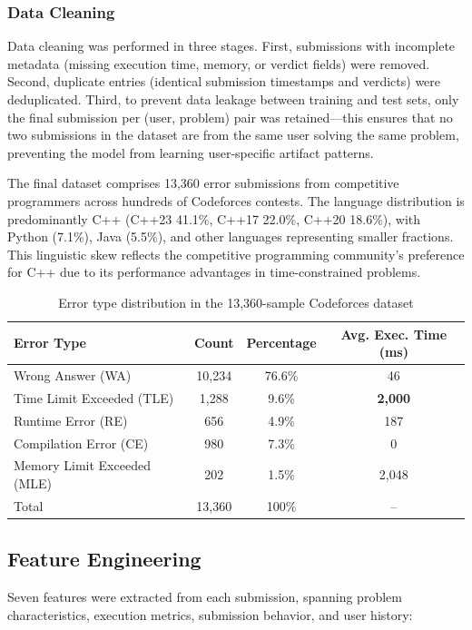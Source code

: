 \documentclass[10pt,letterpaper]{article}
\begin{document}
\subsubsection*{Data Cleaning}
Data cleaning was performed in three stages. First, submissions with
incomplete metadata (missing execution time, memory, or verdict fields) were
removed. Second, duplicate entries (identical submission timestamps and
verdicts) were deduplicated. Third, to prevent data leakage between training
and test sets, only the final submission per (user, problem) pair was
retained---this ensures that no two submissions in the dataset are from the
same user solving the same problem, preventing the model from learning
user-specific artifact patterns.

The final dataset comprises 13,360 error submissions from competitive programmers
across hundreds of Codeforces contests. The language distribution
is predominantly C++ (C++23 41.1\%, C++17 22.0\%, C++20 18.6\%), with Python (7.1\%), Java (5.5\%), and other languages representing smaller fractions. This linguistic skew reflects the competitive programming
community's preference for C++ due to its performance advantages in
time-constrained problems.

\begin{table}[htbp]
\centering
\caption{Error type distribution in the 13,360-sample Codeforces dataset}
\label{tab:error-dist}
\begin{tabular}{@{}lccc@{}}
\toprule
Error Type & Count & Percentage & Avg. Exec. Time (ms) \\
\midrule
Wrong Answer (WA)           & 10,234 & 76.6\% & 46 \\
Time Limit Exceeded (TLE)   & 1,288  & 9.6\% & \textbf{2,000} \\
Runtime Error (RE)          & 656  & 4.9\%  & 187 \\
Compilation Error (CE)      & 980  & 7.3\%  & 0 \\
Memory Limit Exceeded (MLE) & 202    & 1.5\%  & 2,048 \\
\midrule
Total                       & 13,360 & 100\% & -- \\
\bottomrule
\end{tabular}
\end{table}

\subsection{Feature Engineering}

Seven features were extracted from each submission, spanning problem
characteristics, execution metrics, submission behavior, and user history:
\end{document}
